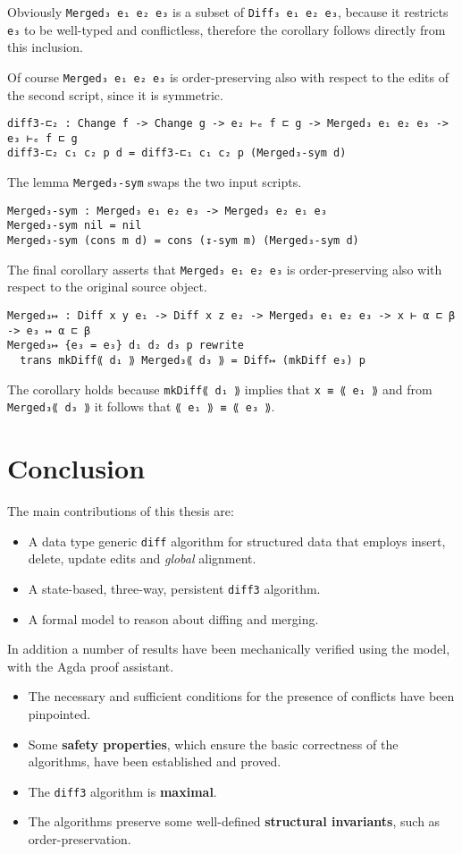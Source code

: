 \documentclass[../Thesis.tex]{subfiles}
\begin{document}
	Obviously \texttt{Merged₃ e₁ e₂ e₃} is a subset of \texttt{Diff₃ e₁ e₂ e₃}, 
	because it restricts \texttt{e₃} to be well-typed and conflictless, therefore 
	the corollary follows directly from this inclusion.
	
	Of course \texttt{Merged₃ e₁ e₂ e₃} is order-preserving also with respect
	to the edits of the second script, since it is symmetric.
	
\begin{verbatim}
diff3-⊏₂ : Change f -> Change g -> e₂ ⊢ₑ f ⊏ g -> Merged₃ e₁ e₂ e₃ -> e₃ ⊢ₑ f ⊏ g
diff3-⊏₂ c₁ c₂ p d = diff3-⊏₁ c₁ c₂ p (Merged₃-sym d)
\end{verbatim}
	
	The lemma \texttt{Merged₃-sym} swaps the two input scripts.
\begin{verbatim}
Merged₃-sym : Merged₃ e₁ e₂ e₃ -> Merged₃ e₂ e₁ e₃
Merged₃-sym nil = nil
Merged₃-sym (cons m d) = cons (↧-sym m) (Merged₃-sym d)
\end{verbatim}	
	
	The final corollary asserts that \texttt{Merged₃ e₁ e₂ e₃} is 
	order-preserving also with respect to 	the original source object.

\begin{verbatim}
Merged₃↦ : Diff x y e₁ -> Diff x z e₂ -> Merged₃ e₁ e₂ e₃ -> x ⊢ α ⊏ β -> e₃ ↦ α ⊏ β
Merged₃↦ {e₃ = e₃} d₁ d₂ d₃ p rewrite
  trans mkDiff⟪ d₁ ⟫ Merged₃⟪ d₃ ⟫ = Diff↦ (mkDiff e₃) p
\end{verbatim}

	The corollary holds because \texttt{mkDiff⟪ d₁ ⟫} implies that
	\texttt{x ≡ ⟪ e₁ ⟫} and from \texttt{Merged₃⟪ d₃ ⟫} it follows
	that \texttt{⟪ e₁ ⟫ ≡ ⟪ e₃ ⟫}.
	
\section{Conclusion}
The main contributions of this thesis are:
\begin{itemize}
	\item A data type generic \texttt{diff} algorithm for structured
			data that employs insert, delete, update edits and \emph{global} 
			alignment.
	\item A state-based, three-way, persistent \texttt{diff3} algorithm.
	\item A formal model to reason about diffing 
				and merging.
\end{itemize}

In addition a number of results have been mechanically verified using the model, with the Agda proof assistant.
\begin{itemize}
	\item The necessary and sufficient conditions for the presence of conflicts 
	have been pinpointed.
	\item Some \textbf{safety properties}, which ensure the basic correctness 
	of the algorithms, have been established and proved.
	\item The \texttt{diff3} algorithm is \textbf{maximal}.
	\item The algorithms preserve some well-defined \textbf{structural invariants}, such as order-preservation.
\end{itemize}
\end{document}
